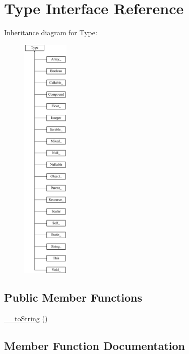\hypertarget{interfacephp_documentor_1_1_reflection_1_1_type}{}\section{Type Interface Reference}
\label{interfacephp_documentor_1_1_reflection_1_1_type}
Inheritance diagram for Type\+:\begin{figure}[H]
\begin{center}
\leavevmode
\includegraphics[height=12.000000cm]{interfacephp_documentor_1_1_reflection_1_1_type}
\end{center}
\end{figure}
\subsection*{Public Member Functions}
\begin{DoxyCompactItemize}
\item 
\mbox{\hyperlink{interfacephp_documentor_1_1_reflection_1_1_type_a7516ca30af0db3cdbf9a7739b48ce91d}{\+\_\+\+\_\+to\+String}} ()
\end{DoxyCompactItemize}


\subsection{Member Function Documentation}
\mbox{\label{interfacephp_documentor_1_1_reflection_1_1_type_a7516ca30af0db3cdbf9a7739b48ce91d}} 
